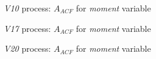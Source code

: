 \documentclass[12 pt]{scrartcl}
\begin{document}
\begin{figure}[p]
  \caption{\emph{V10} process: $A_{ACF}$ for \emph{moment} variable}
  \label{fig:v10-moment-aacf}
\end{figure}



\begin{figure}[p]
  \caption{\emph{V17} process: $A_{ACF}$ for \emph{moment} variable}
  \label{fig:v17-moment-aacf}
\end{figure}


\begin{figure}[p]
  \caption{\emph{V20} process: $A_{ACF}$ for \emph{moment} variable}
  \label{fig:v20-moment-aacf}
\end{figure}
\end{document}
